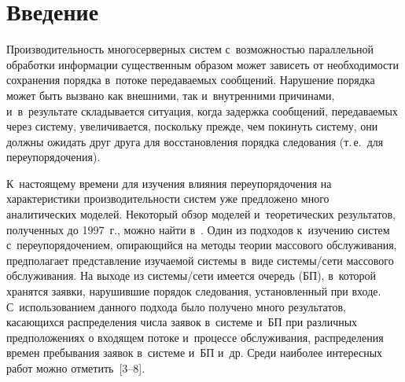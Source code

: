 




\thispagestyle{headings}

\begin{multicols}{2}

\label{st\stat}

\section{Введение}

Производительность многосерверных систем с~возможностью параллельной
обработки информации существенным образом может зависеть от
необходимости сохранения порядка в~потоке передаваемых сообщений.
Нарушение порядка может быть вызвано как внешними, так и~внутренними
причинами, и~в~результате складывается ситуация, когда задержка
сообщений, передаваемых через сис\-те\-му, увеличивается, поскольку
прежде, чем покинуть систему, они должны ожидать друг друга для
восстановления порядка следования (т.\,е.\ для переупорядочения). 

К~настоящему времени для изучения влияния переупорядочения на
характеристики производительности сис\-тем уже предложено много
аналитических моделей. Некоторый обзор моделей и~тео\-ре\-ти\-че\-ских
результатов, полученных до 1997~г., можно найти в~\cite{new7, new8}. 
Один из подходов к~изуче\-нию сис\-тем с~переупорядочением,
опирающийся на методы тео\-рии массового обслуживания, предполагает
представление изучаемой сис\-те\-мы в~виде сис\-те\-мы/се\-ти массового
обслуживания. На выходе из системы/сети имеется очередь (БП), 
в~которой хранятся заявки, нарушившие порядок следования,
установленный при входе. С~использованием данного подхода было
получено много результатов, касающихся распределения числа заявок 
в~системе и~БП
 при различных предположениях о входящем потоке 
 и~процессе обслуживания, распределения времен пребывания заявок
в~системе и~БП и~др. Среди наиболее интересных работ можно 
отметить~[3--8].


\end{multicols}
